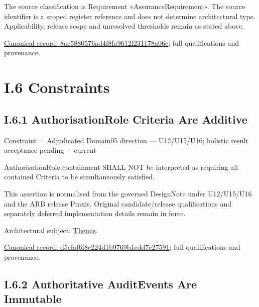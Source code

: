 The source classification is Requirement «AssuranceRequirement». The source identifier is a scoped register reference and does not determine architectural type. Applicability, release scope and unresolved thresholds remain as stated above.


{\footnotesize \href{../../../../../../../../continuum/motivation/requirement/assurance-requirement/8ac5880576ad4f8fa9612f231178a06c.md}{Canonical record: 8ac5880576ad4f8fa9612f231178a06c}; full qualifications and provenance.}\par
\chapter*{I.6 Constraints}
\label{navigation:I.6}

\section*{I.6.1 AuthorisationRole Criteria Are Additive}
\label{navigation:I.6.1}

\label{element:d5cfaf6f8c224d1b9769b1edd7c27591}
{\small Constraint · Adjudicated Domain05 direction — U12/U15/U16; holistic result acceptance pending · current}\par

AuthorisationRole containment SHALL NOT be interpreted as requiring all contained Criteria to be simultaneously satisfied.



This assertion is normalised from the governed DesignNote under U12/U15/U16 and the ARB release Praxis. Original candidate/release qualifications and separately deferred implementation details remain in force.



Architectural subject: \hyperref[element:899d34ec491948b68aad09e507dea6d1]{Themis}.


{\footnotesize \href{../../../../../../../../continuum/motivation/constraint/d5cfaf6f8c224d1b9769b1edd7c27591.md}{Canonical record: d5cfaf6f8c224d1b9769b1edd7c27591}; full qualifications and provenance.}\par
\section*{I.6.2 Authoritative AuditEvents Are Immutable}
\label{navigation:I.6.2}

